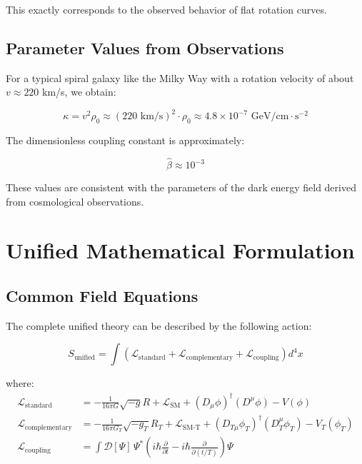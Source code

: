\documentclass[a4paper,12pt]{article}
\begin{document}
	This exactly corresponds to the observed behavior of flat rotation curves.
	
	\subsection{Parameter Values from Observations}
	
	For a typical spiral galaxy like the Milky Way with a rotation velocity of about $v \approx 220$ km/s, we obtain:
	
	\begin{equation}
		\kappa = v^2 \rho_0 \approx (220 \text{ km/s})^2 \cdot \rho_0 \approx 4.8 \times 10^{-7} \text{ GeV/cm} \cdot \text{s}^{-2}
	\end{equation}
	
	The dimensionless coupling constant is approximately:
	
	\begin{equation}
		\hat{\beta} \approx 10^{-3}
	\end{equation}
	
	These values are consistent with the parameters of the dark energy field derived from cosmological observations.
	
	\section{Unified Mathematical Formulation}
	
	\subsection{Common Field Equations}
	
	The complete unified theory can be described by the following action:
	
	\begin{equation}
		S_\text{unified} = \int \left( \mathcal{L}_\text{standard} + \mathcal{L}_\text{complementary} + \mathcal{L}_\text{coupling} \right) d^4x
	\end{equation}
	
	where:
	\begin{align}
		\mathcal{L}_\text{standard} &= -\frac{1}{16\pi G} \sqrt{-g} R + \mathcal{L}_\text{SM} + (D_\mu \phi)^\dagger (D^\mu \phi) - V(\phi) \\
		\mathcal{L}_\text{complementary} &= -\frac{1}{16\pi G_T} \sqrt{-g_T} R_T + \mathcal{L}_\text{SM-T} + (D_{T\mu} \phi_T)^\dagger (D_T^\mu \phi_T) - V_T(\phi_T) \\
		\mathcal{L}_\text{coupling} &= \int \mathcal{D}[\Psi] \, \Psi^* \left( i\hbar \frac{\partial}{\partial t} - i\hbar \frac{\partial}{\partial (t/T)} \right) \Psi
	\end{align}
	
\end{document}
